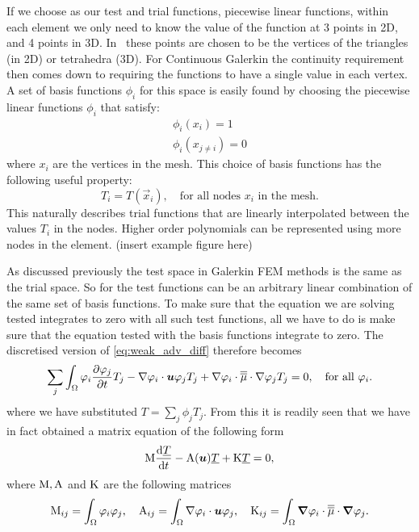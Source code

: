 If we choose \Pone as our test and trial functions, \ie piecewise linear
functions, within each element we only need to know the value 
of the function at 3 points in 2D, and 4 points in 3D. 
In \fluidity\ these points are chosen to be the vertices of 
the triangles (in 2D) or tetrahedra (3D). 
For Continuous Galerkin the continuity 
requirement then comes down to requiring 
the functions to have a single value in each
vertex. A set of basis functions $\phi_i$ 
for this space is easily found by choosing the piecewise linear functions
$\phi_i$ that satisfy:
\begin{gather*}
  \phi_i(x_i)=1\\
  \phi_i(x_{j\neq i})=0
\end{gather*}
where $x_i$ are the vertices in the mesh. 
This choice of basis functions has the following useful property:
\begin{equation*}
  T_i=T(\vec{x}_i),\quad \text{for all nodes $x_i$ in the mesh.}
\end{equation*}
This naturally describes trial functions that are linearly 
interpolated between the values $T_i$ in the nodes.
Higher order polynomials can be represented using more 
nodes in the element.
(insert \Ptwo example figure here)

As discussed previously the test space in Galerkin FEM methods is the same as the 
trial space. So for \PN the test functions can be an arbitrary linear combination 
of the same set of basis functions. To make sure that the equation we are solving 
tested integrates to zero with all such test functions, all we have to do is make sure
that the equation tested with the basis functions integrate to zero. The discretised 
version of \eqref{eq:weak_adv_diff} therefore becomes
\begin{equation}\label{eq:weak_adv_diff}
  \sum_j \int_\Omega \varphi_i \frac{\partial \varphi_j}{\partial t}  T_j -
    \nabla\varphi_i\cdot{\mbox{\boldmath$u$}}\varphi_j  T_j + 
    \nabla\varphi_i\cdot \overline{\overline{\mu}}\cdot\nabla \varphi_j T_j = 0,
    \quad\text{for all }\varphi_i.
\end{equation}
where we have substituted $T=\sum_j \phi_j T_j$. From this it is readily seen that 
we have in fact obtained a matrix equation of the following form
\begin{equation*}
  \mathrm{M} \frac{\mathrm{d}\underline{T}}{\mathrm{d} t}-\mathrm{A}({\mbox{\boldmath$u$}})\underline{T}+\mathrm{K}\underline{T}=0,
  \label{eq:cg_adv_diff_mat}
\end{equation*}
where $\mathrm{M}, \mathrm{A}$ and $\mathrm{K}$ are the following matrices
\begin{equation*}
  \mathrm{M}_{ij}=\int_\Omega \varphi_i\varphi_j, \quad
  \mathrm{A}_{ij}=\int_\Omega \nabla\varphi_i\cdot{\mbox{\boldmath$u$}} \varphi_j, \quad
  \mathrm{K}_{ij}=\int_\Omega {\mbox{\boldmath$\nabla$}}\varphi_i\cdot \overline{\overline{\mu}}\cdot{\mbox{\boldmath$\nabla$}} \varphi_j.
\end{equation*}

